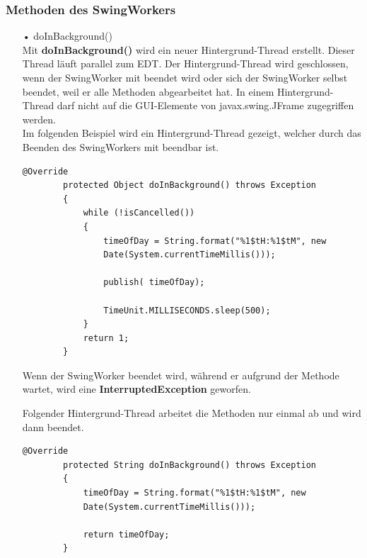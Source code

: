 \subsubsection{Methoden des SwingWorkers}
\begin{itemize}
\item[•] doInBackground()
\\ Mit \textbf{doInBackground()} wird ein neuer Hintergrund-Thread erstellt. Dieser Thread läuft parallel zum \ac{EDT}. Der Hintergrund-Thread wird geschlossen, wenn der SwingWorker mit  beendet wird oder sich der SwingWorker selbst beendet, weil er alle Methoden abgearbeitet hat. In einem Hintergrund-Thread darf nicht auf die \ac{GUI}-Elemente von javax.swing.JFrame zugegriffen werden. 
\\ Im folgenden Beispiel wird ein Hintergrund-Thread gezeigt, welcher durch das Beenden des SwingWorkers mit  beendbar ist.
\begin{lstlisting}[style=JavaStyle, caption=SwingWorker \inlinecode{JavaStyle}{doInBackground()} mit while Schleife]
        @Override
        protected Object doInBackground() throws Exception
        {
            while (!isCancelled())
            {
                timeOfDay = String.format("%1$tH:%1$tM", new
                Date(System.currentTimeMillis()));

                publish( timeOfDay);

                TimeUnit.MILLISECONDS.sleep(500);
            }
            return 1;
        }
\end{lstlisting} 
Wenn der SwingWorker beendet wird, während er aufgrund der Methode \\  wartet, wird eine \textbf{InterruptedException} geworfen.

\vspace{10pt}

Folgender Hintergrund-Thread arbeitet die Methoden nur einmal ab und wird dann beendet. 
\begin{lstlisting}[style=JavaStyle, caption=SwingWorker \inlinecode{JavaStyle}{doInBackground()} ohne while Schleife, label=SwingWorkerOhneWhileSchleife]
        @Override
        protected String doInBackground() throws Exception
        {
            timeOfDay = String.format("%1$tH:%1$tM", new 
            Date(System.currentTimeMillis()));
            
            return timeOfDay;
        }
\end{lstlisting} 


\end{itemize}
